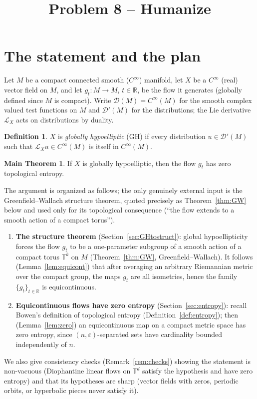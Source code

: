 \documentclass[11pt]{article}
\title{Problem 8 -- Humanize}
\author{}
\date{}
\theoremstyle{definition}
\newtheorem{definition}[theorem]{Definition}
\newtheorem*{mainthm}{Main Theorem}
\newcommand{\calL}{\mathcal{L}}
\newcommand{\TT}{\mathbb{T}}
\newcommand{\RR}{\mathbb{R}}
\begin{document}
\maketitle

\section{The statement and the plan}\label{sec:intro}

Let $M$ be a compact connected smooth ($C^\infty$) manifold, let $X$ be a
$C^\infty$ (real) vector field on $M$, and let $g_t : M \to M$,
$t \in \RR$, be the flow it generates (globally defined since $M$ is
compact). Write $\mathcal{D}(M) = C^\infty(M)$ for the smooth complex
valued test functions on $M$ and $\mathcal{D}'(M)$ for the distributions;
the Lie derivative $\calL_X$ acts on distributions by duality.

\begin{definition}\label{def:GH}
$X$ is \emph{globally hypoelliptic} (GH) if every distribution
$u \in \mathcal{D}'(M)$ such that $\calL_X u \in C^\infty(M)$ is itself in
$C^\infty(M)$.
\end{definition}

\begin{mainthm}
If $X$ is globally hypoelliptic, then the flow $g_t$ has zero topological
entropy.
\end{mainthm}

The argument is organized as follows; the only genuinely external input is
the Greenfield--Wallach structure theorem, quoted precisely as
Theorem~\ref{thm:GW} below and used only for its topological consequence
(``the flow extends to a smooth action of a compact torus'').
\begin{enumerate}[label=(\arabic*), leftmargin=2.5em]
  \item \textbf{The structure theorem} (Section~\ref{sec:GHtostruct}):
        global hypoellipticity forces the flow $g_t$ to be a
        one-parameter subgroup of a smooth action of a compact torus
        $\TT^k$ on $M$ (Theorem~\ref{thm:GW}, Greenfield--Wallach).
        It follows (Lemma~\ref{lem:equicont}) that after averaging an
        arbitrary Riemannian metric over the compact group, the maps
        $g_t$ are all isometries, hence the family
        $\{g_t\}_{t \in \RR}$ is equicontinuous.
  \item \textbf{Equicontinuous flows have zero entropy}
        (Section~\ref{sec:entropy}): recall Bowen's definition of
        topological entropy (Definition~\ref{def:entropy}); then
        (Lemma~\ref{lem:zero}) an equicontinuous map on a compact metric
        space has zero entropy, since $(n,\varepsilon)$-separated sets
        have cardinality bounded independently of $n$.
\end{enumerate}
We also give consistency checks (Remark~\ref{rem:checks}) showing the
statement is non-vacuous (Diophantine linear flows on $\TT^d$ satisfy the
hypothesis and have zero entropy) and that its hypotheses are sharp
(vector fields with zeros, periodic orbits, or hyperbolic pieces never
satisfy it).
\end{document}

